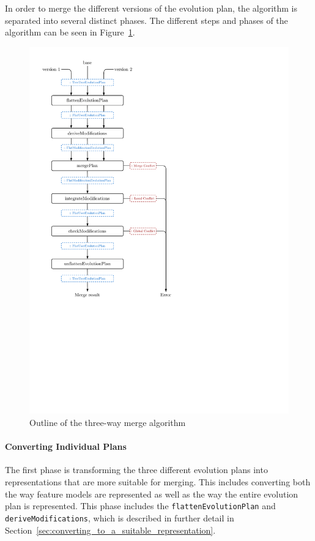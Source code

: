 \documentclass[a4paper,english]{ifimaster}
\begin{document}
In order to merge the different versions of the evolution plan, the algorithm is separated into several distinct phases. The different steps and phases of the algorithm can be seen in Figure~\ref{fig:merge_outline}.

\begin{figure}[htbp]
  \centering
  \includegraphics[width=0.8\linewidth]{merge_outline}
  \caption{Outline of the three-way merge algorithm}%
  \label{fig:merge_outline}
\end{figure}

\paragraph{Converting Individual Plans}%
\label{par:converting_individual_plans}

The first phase is transforming the three different evolution plans into representations that are more suitable for merging. This includes converting both the way feature models are represented as well as the way the entire evolution plan is represented. This phase includes the \texttt{flatten\-Evolution\-Plan} and \texttt{derive\-Modifications}, which is described in further detail in Section~\vref{sec:converting_to_a_suitable_representation}.
\end{document}
